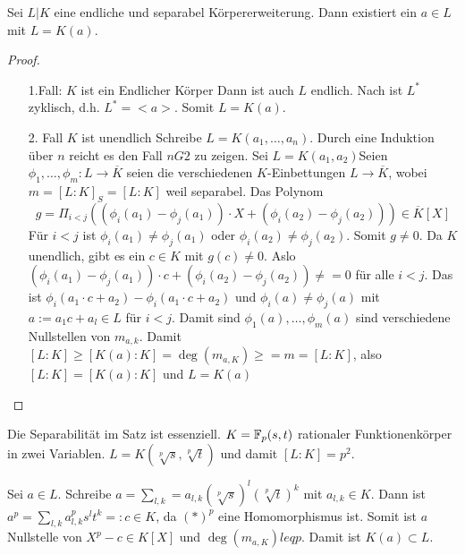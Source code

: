 \documentclass[../main.tex]{subfiles}
\begin{document}
\begin{theorem}
    Sei $L|K$ eine endliche und separabel Körpererweiterung.
    Dann existiert ein $a\in L$ mit $L=K(a)$.
\end{theorem}
\begin{proof}

    \begin{enumerate}
        \item [1.Fall: $K$ ist ein Endlicher Körper] 
        Dann ist auch $L$ endlich. Nach  ist $L^*$ zyklisch, d.h. $L^*=<a>$. 
        Somit $L=K(a)$.
        \item [2. Fall $K$ ist unendlich]
        Schreibe $L=K(a_1, \dots, a_n)$. Durch eine Induktion über $n$ reicht es den Fall $nG2$ zu zeigen.
        Sei $L = K(a_1,a_2)$Seien $\phi_1,\dots,\phi_m: L\rightarrow \overline{K}$ seien die verschiedenen $K$-Einbettungen $L\rightarrow \overline{K}$, wobei $m=[L:K]_S=[L:K]$ weil separabel.
        Das Polynom $$g = \Pi_{i<j} \left((\phi_i(a_1)-\phi_j(a_1))\cdot X + (\phi_i(a_2)-\phi_j(a_2))\right)\in \overline{K}[X]$$
        Für $i<j$ ist $\phi_i(a_1)\neq \phi_j(a_1)$ oder $\phi_i(a_2)\neq\phi_j(a_2)$.
        Somit $g\neq 0$.
        Da $K$ unendlich, gibt es ein $c\in K$ mit $g(c)\neq 0$.
        Aslo $(\phi_i(a_1)-\phi_j(a_1))\cdot c + (\phi_i(a_2)-\phi_j(a_2)) \neq = 0$ für alle $i<j$.
        Das ist $\phi_i(a_1 \cdot c + a_2)- \phi_i(a_1\cdot c + a_2)$ und $\phi_i(a) \neq \phi_j(a)$ mit $a := a_1c+a_l\in L$ für $i<j$.
        Damit sind $\phi_1(a),\dots,\phi_m(a)$ sind verschiedene Nullstellen von $m_{a,k}$.
        Damit $[L:K] \geq [K(a):K] = \deg(m_{a,K}) \geq = m = [L:K]$, also $[L:K] = [K(a):K]$ und $L=K(a)$
    \end{enumerate}
\end{proof}
\begin{example}
    Die Separabilität im Satz  ist essenziell.
    $K=\mathbb{F}_p(s,t)$ rationaler Funktionenkörper in zwei Variablen.
    $L=K(\sqrt[p]{s},\sqrt[p]{t})$ und damit $[L:K] = p^2$. \TODO[Graphik]

    Sei $a\in L$.
    Schreibe $a = \sum_{l,k} = a_{l,k} (\sqrt[p]{s})^l(\sqrt[p]{t})^k$ mit $a_{l,k}\in K$.
    Dann ist $a^p=\sum_{l,k} a_{l,k}^p s^l t^k =: c\in K$, da $(*)^p$ eine Homomorphismus ist.
    Somit ist $a$ Nullstelle von $X^p-c\in K[X]$ und $\deg(m_{a,K}) leq p$.
    Damit ist $K(a)\subset L$.
\end{example}
\end{document}
